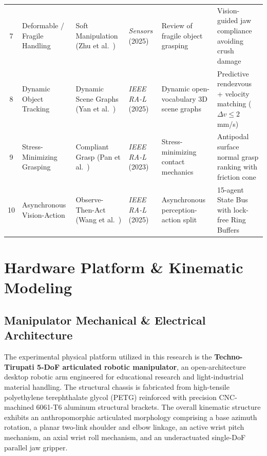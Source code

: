 \documentclass[journal]{IEEEtran}
\begin{document}
\begin{table}[!t]
{\begin{tabular}{clllll}
7 & Deformable / Fragile Handling & Soft Manipulation (Zhu et al.~\cite{aria_119_zhu_2025_deformable}) & \textit{Sensors} (2025) & Review of fragile object grasping & Vision-guided jaw compliance avoiding crush damage \\
8 & Dynamic Object Tracking & Dynamic Scene Graphs (Yan et al.~\cite{aria_055_yan_2025_dynamic}) & \textit{IEEE RA-L} (2025) & Dynamic open-vocabulary 3D scene graphs & Predictive rendezvous + velocity matching ($\Delta v \le 2$\,mm/s) \\
9 & Stress-Minimizing Grasping & Compliant Grasp (Pan et al.~\cite{aria_025_group_2023_stressminimizing}) & \textit{IEEE RA-L} (2023) & Stress-minimizing contact mechanics & Antipodal surface normal grasp ranking with friction cone \\
10 & Asynchronous Vision-Action & Observe-Then-Act (Wang et al.~\cite{aria_096_group_2025_observe}) & \textit{IEEE RA-L} (2025) & Asynchronous perception-action split & 15-agent State Bus with lock-free Ring Buffers \\
\bottomrule
\end{tabular}%
}
\end{table}
\section{Hardware Platform \& Kinematic Modeling}

\subsection{Manipulator Mechanical \& Electrical Architecture}
The experimental physical platform utilized in this research is the \textbf{Techno-Tirupati 5-DoF articulated robotic manipulator}, an open-architecture desktop robotic arm engineered for educational research and light-industrial material handling. The structural chassis is fabricated from high-tensile polyethylene terephthalate glycol (PETG) reinforced with precision CNC-machined 6061-T6 aluminum structural brackets. The overall kinematic structure exhibits an anthropomorphic articulated morphology comprising a base azimuth rotation, a planar two-link shoulder and elbow linkage, an active wrist pitch mechanism, an axial wrist roll mechanism, and an underactuated single-DoF parallel jaw gripper.
\end{document}
